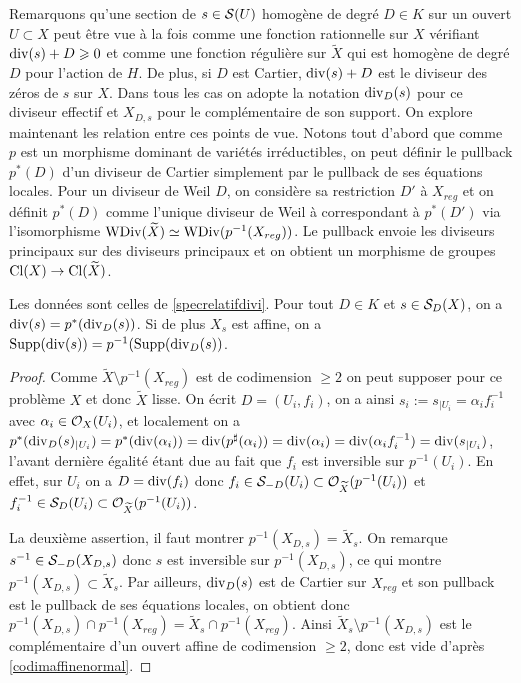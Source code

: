 Remarquons qu'une section de $s\in \mathcal{S}(U)$ homogène de degré $D\in K$ sur un ouvert $U\subset X$ peut être vue à la fois comme une fonction rationnelle sur $X$ vérifiant $\operatorname{div}(s)+D\geqslant 0$ et comme une fonction régulière sur $\widetilde{X}$ qui est homogène de degré $D$ pour l'action de $H$. De plus, si $D$ est Cartier, $\operatorname{div}(s)+D$ est le diviseur des zéros de $s$ sur $X$. Dans tous les cas on adopte la notation $\operatorname{div}_D(s)$ pour ce diviseur effectif et $X_{D,s}$ pour le complémentaire de son support. On explore maintenant les relation entre ces points de vue. Notons tout d'abord que comme $p$ est un morphisme dominant de variétés irréductibles, on peut définir le pullback $p^*(D)$ d'un diviseur de Cartier simplement par le pullback de ses équations locales. Pour un diviseur de Weil $D$, on considère sa restriction $D'$ à $X_{reg}$ et on définit $p^*(D)$ comme l'unique diviseur de Weil à correspondant à $p^*(D')$ via l'isomorphisme $\operatorname{WDiv}(\widetilde{X})\simeq\operatorname{WDiv}(p^{-1}(X_{reg}))$. Le pullback envoie les diviseurs principaux sur des diviseurs principaux et on obtient un morphisme de groupes $\operatorname{Cl}(X)\rightarrow \operatorname{Cl}(\widetilde{X})$.

\begin{prop}\label{pstarprincipal}
Les données sont celles de \ref{specrelatifdivi}. Pour tout $D\in K$ et $s\in\mathcal{S}_D(X)$, on a $\operatorname{div}(s)=p^*(\operatorname{div}_D(s))$. Si de plus $X_s$ est affine, on a $\operatorname{Supp}(\operatorname{div}(s))=p^{-1}(\operatorname{Supp}(\operatorname{div}_D(s))$.
\end{prop}
\begin{proof}
Comme $\widetilde{X}\setminus p^{-1}(X_{reg})$ est de codimension $\geq 2$ on peut supposer pour ce problème $X$ et donc $\widetilde{X}$ lisse. On écrit $D=(U_i, f_i)$, on a ainsi $s_i:=s_{|U_i}=\alpha_i f_i^{-1}$ avec $\alpha_i\in \mathcal{O}_X(U_i)$, et localement on a $p^*(\operatorname{div}_D(s)_{|U_i})=p^*(\operatorname{div}(\alpha_i))=\operatorname{div}(p^\sharp(\alpha_i))=\operatorname{div}(\alpha_i)=\operatorname{div}(\alpha_i f_i^{-1})=\operatorname{div}(s_{|U_i})$, l'avant dernière égalité étant due au fait que $f_i$ est inversible sur $p^{-1}(U_i)$. En effet, sur $U_i$ on a $D=\operatorname{div}(f_i)$ donc $f_i\in \mathcal{S}_{-D}(U_i)\subset\mathcal{O}_{\widetilde{X}}(p^{-1}(U_i))$ et $f_i^{-1}\in \mathcal{S}_D(U_i)\subset\mathcal{O}_{\widetilde{X}}(p^{-1}(U_i))$.

La deuxième assertion, il faut montrer $p^{-1}(X_{D,s})=\widetilde{X}_s$. On remarque $s^{-1}\in \mathcal{S}_{-D}(X_{D,s})$ donc $s$ est inversible sur $p^{-1}(X_{D,s})$, ce qui montre $p^{-1}(X_{D,s})\subset \widetilde{X}_s$. Par ailleurs, $\operatorname{div}_D(s)$ est de Cartier sur $X_{reg}$ et son pullback est le pullback de ses équations locales, on obtient donc $p^{-1}(X_{D,s})\cap p^{-1}(X_{reg})=\widetilde{X}_s \cap p^{-1}(X_{reg})$. Ainsi $\widetilde{X}_s \setminus p^{-1}(X_{D,s})$ est le complémentaire d'un ouvert affine de codimension $\geq 2$, donc est vide d'après \ref{codimaffinenormal}.
\end{proof}

